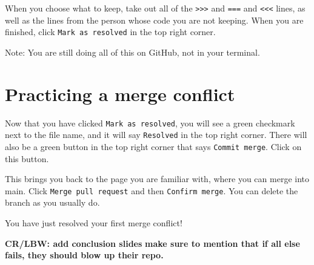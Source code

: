 \documentclass[
]{book}
\begin{document}
When you choose what to keep, take out all of the \texttt{\textgreater{}\textgreater{}\textgreater{}} and \texttt{===} and \texttt{\textless{}\textless{}\textless{}} lines, as well as the lines from the person whose code you are not keeping. When you are finished, click \texttt{Mark\ as\ resolved} in the top right corner.

Note: You are still doing all of this on GitHub, not in your terminal.

\hypertarget{practicing-a-merge-conflict-6}{%
\section{Practicing a merge conflict}\label{practicing-a-merge-conflict-6}}

Now that you have clicked \texttt{Mark\ as\ resolved}, you will see a green checkmark next to the file name, and it will say \texttt{Resolved} in the top right corner. There will also be a green button in the top right corner that says \texttt{Commit\ merge}. Click on this button.

This brings you back to the page you are familiar with, where you can merge into main. Click \texttt{Merge\ pull\ request} and then \texttt{Confirm\ merge}. You can delete the branch as you usually do.

You have just resolved your first merge conflict!

\textbf{CR/LBW: add conclusion slides}
\textbf{make sure to mention that if all else fails, they should blow up their repo.}

  
\end{document}
